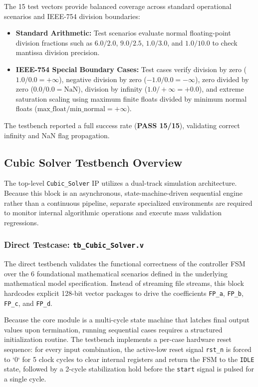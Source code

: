 The 15 test vectors provide balanced coverage across standard operational scenarios and IEEE-754 division boundaries:
\begin{itemize}
    \item \textbf{Standard Arithmetic:} Test scenarios evaluate normal floating-point division fractions such as $6.0 / 2.0$, $9.0 / 2.5$, $1.0 / 3.0$, and $1.0 / 10.0$ to check mantissa division precision.
    \item \textbf{IEEE-754 Special Boundary Cases:} Test cases verify division by zero ($1.0 / 0.0 = +\infty$), negative division by zero ($-1.0 / 0.0 = -\infty$), zero divided by zero ($0.0 / 0.0 = \text{NaN}$), division by infinity ($1.0 / +\infty = +0.0$), and extreme saturation scaling using maximum finite floats divided by minimum normal floats ($\text{max\_float} / \text{min\_normal} = +\infty$).
\end{itemize}
The testbench reported a full success rate (\textbf{PASS 15/15}), validating correct infinity and NaN flag propagation.

\subsection{Cubic Solver Testbench Overview}

The top-level \texttt{Cubic\_Solver} IP utilizes a dual-track simulation architecture. Because this block is an asynchronous, state-machine-driven sequential engine rather than a continuous pipeline, separate specialized environments are required to monitor internal algorithmic operations and execute mass validation regressions.

\subsubsection{Direct Testcase: \texttt{tb\_Cubic\_Solver.v}}

The direct testbench validates the functional correctness of the controller FSM over the 6 foundational mathematical scenarios defined in the underlying mathematical model specification. Instead of streaming file streams, this block hardcodes explicit 128-bit vector packages to drive the coefficients \texttt{FP\_a}, \texttt{FP\_b}, \texttt{FP\_c}, and \texttt{FP\_d}.

Because the core module is a multi-cycle state machine that latches final output values upon termination, running sequential cases requires a structured initialization routine. The testbench implements a per-case hardware reset sequence: for every input combination, the active-low reset signal \texttt{rst\_n} is forced to `0` for 5 clock cycles to clear internal registers and return the FSM to the \texttt{IDLE} state, followed by a 2-cycle stabilization hold before the \texttt{start} signal is pulsed for a single cycle. 


